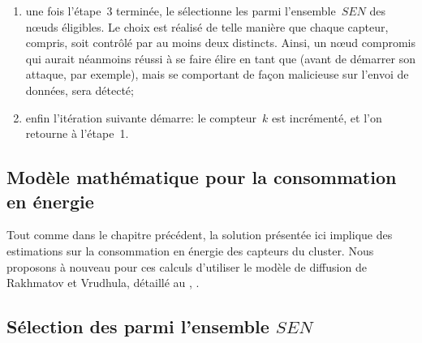 \begin{enumerate}
\begin{itemize}
        \end{itemize}
    \item une fois l'étape~3 terminée, le \CH sélectionne les \cns parmi l'ensemble~$SEN$ des nœuds éligibles. Le choix est réalisé de telle manière que chaque capteur, \cns compris, soit contrôlé par au moins deux \cns distincts. Ainsi, un nœud compromis qui aurait néanmoins réussi à se faire élire en tant que \cn (avant de démarrer son attaque, par exemple), mais se comportant de façon malicieuse sur l'envoi de données, sera détecté;
    \item enfin l'itération suivante démarre: le compteur~$k$ est incrémenté, et l'on retourne à l'étape~1.
\end{enumerate}

\subsection{Modèle mathématique pour la consommation en énergie}

Tout comme dans le chapitre précédent, la solution présentée ici implique des estimations sur la consommation en énergie des capteurs du cluster.
Nous proposons à nouveau pour ces calculs d'utiliser le modèle de diffusion de Rakhmatov et Vrudhula, détaillé au , .

\subsection{Sélection des \cns parmi l'ensemble $SEN$}

